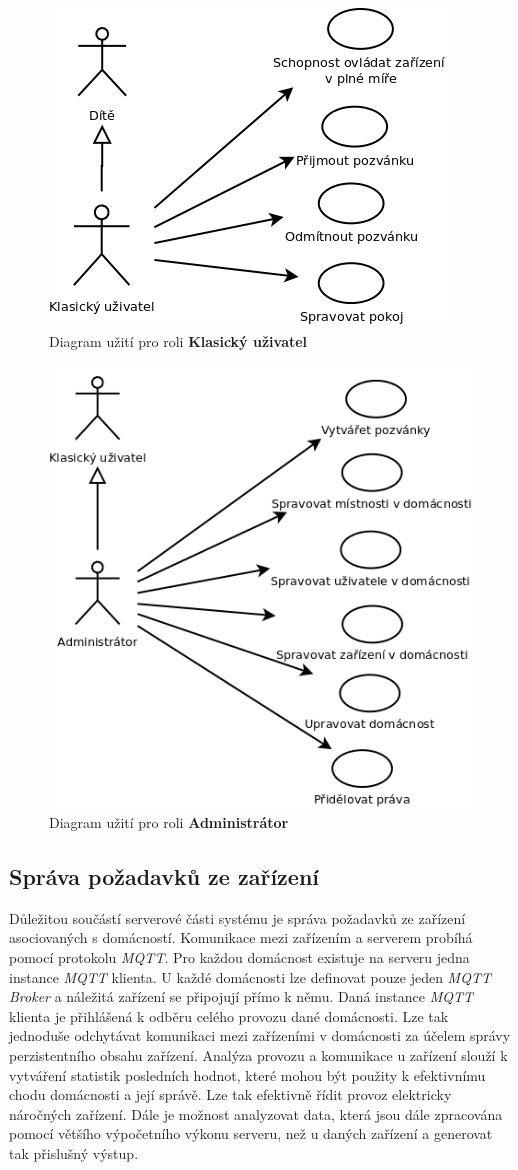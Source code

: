 \begin{figure}[hbt]
  \centering
  \includegraphics[width=0.4 \linewidth]{obrazky-figures/useCaseUser.png}
  \caption{Diagram užití pro roli \textbf{Klasický uživatel}}
  \label{figure:use_case_uzivatel}
\end{figure}

\begin{figure}[hbt]
  \centering
  \includegraphics[width=0.4 \linewidth]{obrazky-figures/useCaseAdmin.png}
  \caption{Diagram užití pro roli \textbf{Administrátor}}
  \label{figure:use_case_admin}
\end{figure}

\newpage
\subsection*{Správa požadavků ze zařízení}
\label{backend:mqtt}

Důležitou součástí serverové části systému je správa požadavků ze zařízení asociovaných s domácností. Komunikace mezi zařízením a serverem probíhá pomocí protokolu \emph{MQTT}.
Pro každou domácnost existuje na serveru jedna instance \emph{MQTT} klienta. U každé domácnosti lze definovat pouze jeden \emph{MQTT Broker} a náležitá zařízení se připojují přímo k němu.
Daná instance \emph{MQTT} klienta je přihlášená k odběru celého provozu dané domácnosti. Lze tak jednoduše odchytávat komunikaci mezi zařízeními v domácnosti za účelem správy perzistentního obsahu zařízení.
Analýza provozu a komunikace u zařízení slouží k vytváření statistik posledních hodnot, které mohou být použity k efektivnímu chodu domácnosti a její správě.
Lze tak efektivně řídit provoz elektricky náročných zařízení. Dále je možnost analyzovat data, která jsou dále zpracována pomocí většího výpočetního výkonu serveru, než u daných zařízení a generovat tak přislušný výstup.

